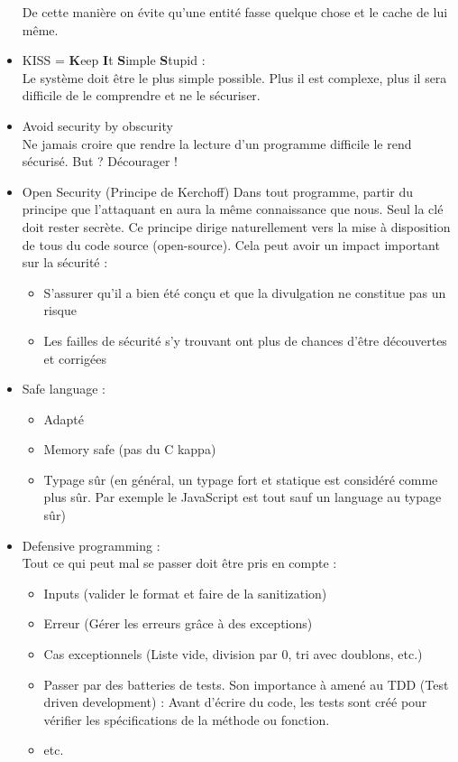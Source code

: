 \documentclass[a4paper]{article}
\begin{document}
\begin{itemize}[label = \textbullet, font = \Large]
\begin{itemize}[label = $\hookrightarrow$, font = \Large]
        \end{itemize}
    De cette manière on évite qu'une entité fasse quelque chose et le cache de lui même.
    \item KISS = \textbf{K}eep \textbf{I}t \textbf{S}imple \textbf{S}tupid :\\
    Le système doit être le plus simple possible. Plus il est complexe, plus il sera difficile de le comprendre et ne le sécuriser.
    \item Avoid security by obscurity\\
    Ne jamais croire que rendre la lecture d'un programme difficile le rend sécurisé. But ? Décourager !
    \item Open Security (Principe de Kerchoff)
    Dans tout programme, partir du principe que l'attaquant en aura la même connaissance que nous. Seul la clé doit rester secrète. Ce principe dirige naturellement vers la mise à disposition de tous du code source (open-source). Cela peut avoir un impact important sur la sécurité :
    \begin{itemize}[label = $\hookrightarrow$, font = \Large]
        \item S'assurer qu'il a bien été conçu et que la divulgation ne constitue pas un risque
        \item Les failles de sécurité s'y trouvant ont plus de chances d'être découvertes et corrigées
    \end{itemize}
    \item Safe language : 
    \begin{itemize}
        \item Adapté
        \item Memory safe (pas du C kappa)
        \item Typage sûr (en général, un typage fort et statique est considéré comme plus sûr. Par exemple le JavaScript est tout sauf un language au typage sûr)
    \end{itemize}
    \item Defensive programming :\\
    Tout ce qui peut mal se passer doit être pris en compte :\begin{itemize}
        \item Inputs (valider le format et faire de la sanitization)
        \item Erreur (Gérer les erreurs grâce à des exceptions)
        \item Cas exceptionnels (Liste vide, division par 0, tri avec doublons, etc.)
        \item Passer par des batteries de tests. Son importance à amené au TDD (Test driven development) : Avant d'écrire du code, les tests sont créé pour vérifier les spécifications de la méthode ou fonction.
        \item etc.
    \end{itemize}
\end{itemize}
\newpage
\end{document}

